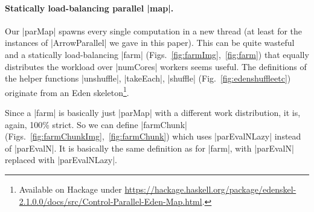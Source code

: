 \paragraph{Statically load-balancing parallel |map|.}
Our |parMap| spawns every single computation in a new thread (at least for the instances of |ArrowParallel| we gave in this paper). This can be quite wasteful and a statically load-balancing |farm| (Figs.~\ref{fig:farmImg},~\ref{fig:farm}) that equally distributes the workload over |numCores| workers seems useful.
The definitions of the helper functions |unshuffle|, |takeEach|, |shuffle| (Fig.~\ref{fig:edenshuffleetc}) originate from an Eden skeleton\footnote{Available on Hackage under \url{https://hackage.haskell.org/package/edenskel-2.1.0.0/docs/src/Control-Parallel-Eden-Map.html}.}.

Since a |farm|  is basically just |parMap| with a different work distribution, it is, again, 100\% strict. So we can define |farmChunk| (Figs.~\ref{fig:farmChunkImg},~\ref{fig:farmChunk}) which uses |parEvalNLazy| instead of |parEvalN|. It is basically the same definition as for |farm|, with |parEvalN| replaced with |parEvalNLazy|.

